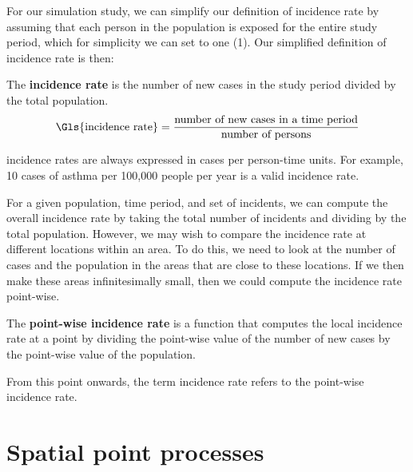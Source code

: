 For our simulation study, we can simplify our definition of \gls{incidence rate} by assuming that each person in the population is exposed for the entire study period,
which for simplicity we can set to one (1).
Our simplified definition of incidence rate is then:

\begin{defn}
    The \textbf{\gls{incidence rate}} is the number of new cases in the study period divided by the total population.
    \begin{equation}
        \label{eq:incidencerate}
        \mbox{\Gls{incidence rate}} = \frac{\mbox{number of new cases in a time period}}
                                        {\mbox{number of persons}}
    \end{equation}
\end{defn}

\Glspl{incidence rate} are always expressed in cases per person-time units.
For example, 10 cases of asthma per 100,000 people per year is a valid \gls{incidence rate}.

For a given population, time period, and set of \glspl{incident},
we can compute the overall \gls{incidence rate} by taking the total number of \glspl{incident} and dividing by the total population.
However, we may wish to compare the \gls{incidence rate} at different locations within an area.
To do this, we need to look at the number of cases and the population in the areas that are close to these locations.
If we then make these areas infinitesimally small,
then we could compute the \gls{incidence rate} point-wise.

\begin{defn}
    \label{defn:incidence_rate}
    The \textbf{point-wise \gls{incidence rate}} is a function that computes the local \gls{incidence rate} at a point by dividing the point-wise value of the number of new cases by the point-wise value of the population.
\end{defn}

From this point onwards, the term \gls{incidence rate} refers to the point-wise \gls{incidence rate}.

\section{Spatial point processes}
\label{sec:theory:spatial_point_processes}

